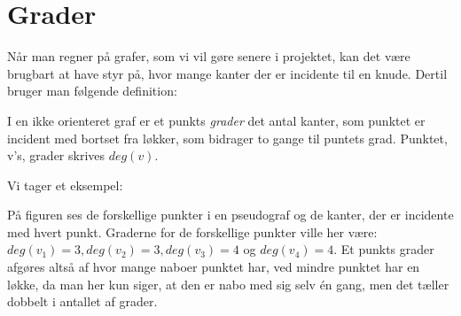 \section{Grader} \label{sec:grader}
Når man regner på grafer, som vi vil gøre senere i projektet, kan det være brugbart at have styr på, hvor mange kanter der er incidente til en knude. Dertil bruger man følgende definition:

\begin{defn}[Grader] \label{defn:grader}
I en ikke orienteret graf er et punkts \emph{grader} det antal kanter, som punktet er incident med bortset fra løkker, som bidrager to gange til puntets grad. Punktet, v's, grader skrives $deg(v)$.
\end{defn}

Vi tager et eksempel:



På figuren ses de forskellige punkter i en pseudograf og de kanter, der er incidente med hvert punkt. Graderne for de forskellige punkter ville her være: $deg(v_{1})=3, deg(v_{2})=3, deg(v_{3})=4$ og $deg(v_{4})=4$. Et punkts grader afgøres altså af hvor mange naboer punktet har, ved mindre punktet har en løkke, da man her kun siger, at den er nabo med sig selv én gang, men det tæller dobbelt i antallet af grader.